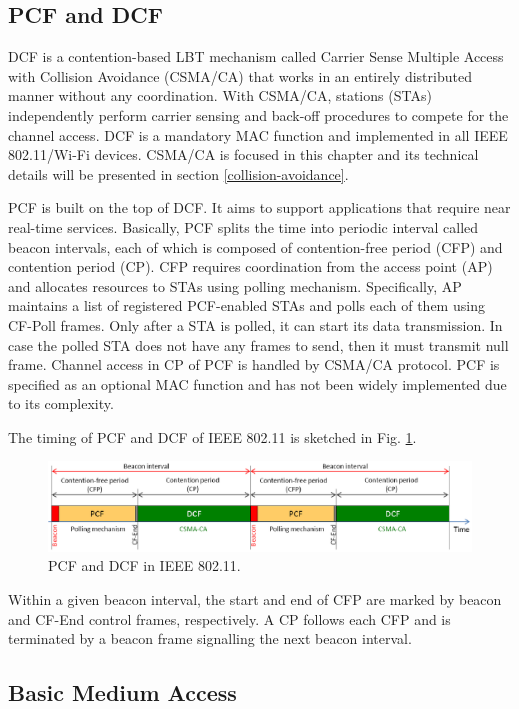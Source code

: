 \subsection{PCF and DCF}
\label{pcf-dcf}

DCF is a contention-based LBT mechanism called Carrier Sense Multiple Access with Collision Avoidance (CSMA/CA) that works in an entirely distributed manner without any coordination. With CSMA/CA, stations (STAs) independently perform carrier sensing and back-off procedures to compete for the channel access. DCF is a mandatory MAC function and implemented in all IEEE 802.11/Wi-Fi devices. CSMA/CA is focused in this chapter and its technical details will be presented in section \ref{collision-avoidance}.

PCF is built on the top of DCF. It aims to support applications that require near real-time services. Basically, PCF splits the time into periodic interval called beacon intervals, each of which is composed of contention-free period (CFP) and contention period (CP). CFP requires coordination from the access point (AP) and allocates resources to STAs using polling mechanism. Specifically, AP maintains a list of registered PCF-enabled STAs and polls each of them using CF-Poll frames. Only after a STA is polled, it can start its data transmission. In case the polled STA does not have any frames to send, then it must transmit null frame. Channel access in CP of PCF is handled by CSMA/CA protocol. PCF is specified as an optional MAC function and has not been widely implemented due to its complexity.

The timing of PCF and DCF of IEEE 802.11 is sketched in Fig. \ref{figs:802-11-PCF-DCF}. 
\begin{figure}[!ht]
	\centering
	\includegraphics[width=1.0\columnwidth]{figs/802-11-PCF-DCF}
	\caption{PCF and DCF in IEEE 802.11.}
	\label{figs:802-11-PCF-DCF}
\end{figure}
Within a given beacon interval, the start and end of CFP are marked by beacon and CF-End control frames, respectively. A CP follows each CFP and is terminated by a beacon frame signalling the next beacon interval. 

\subsection{Basic Medium Access}
\label{basic-medium-access}

